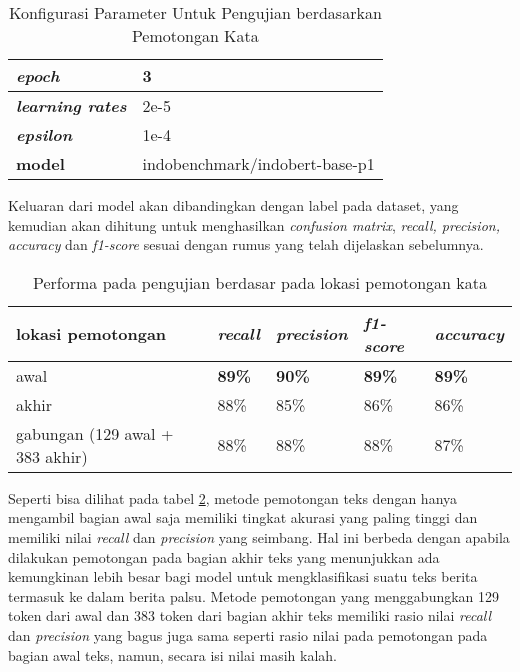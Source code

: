 \begin{table}
    \caption{Konfigurasi Parameter Untuk Pengujian berdasarkan Pemotongan Kata}
    \label{tab: truncate_param}
    \centering
    \begin{tabular}{|l|l|}
        \hline
        \textit{\textbf{epoch}}          & 3                              \\ \hline
        \textit{\textbf{learning rates}} & 2e-5                           \\ \hline
        \textit{\textbf{epsilon}}        & 1e-4                           \\ \hline
        \textbf{model}                   & indobenchmark/indobert-base-p1 \\ \hline
    \end{tabular}
\end{table}

Keluaran dari model akan dibandingkan dengan label pada dataset, yang kemudian akan dihitung untuk menghasilkan \textit{confusion matrix}, \textit{recall, precision, accuracy} dan \textit{f1-score} sesuai dengan rumus yang telah dijelaskan sebelumnya.

\begin{table}
    \centering
    \caption{Performa pada pengujian berdasar pada lokasi pemotongan kata}
    \label{tab: truncate_result}
    \begin{tabular}{|p{}|l|l|l|l|}
        \hline
        \textbf{lokasi pemotongan}      & \textit{\textbf{recall}} & \textit{\textbf{precision}} & \textit{\textbf{f1-score}} & \textit{\textbf{accuracy}} \\ \hline
        awal                            & \textbf{89\%}            & \textbf{90\%}               & \textbf{89\%}              & \textbf{89\%}              \\ \hline
        akhir                           & 88\%                     & 85\%                        & 86\%                       & 86\%                       \\ \hline
        gabungan (129 awal + 383 akhir) & 88\%                     & 88\%                        & 88\%                       & 87\%                       \\ \hline
    \end{tabular}
\end{table}

Seperti bisa dilihat pada tabel \ref{tab: truncate_result}, metode pemotongan teks dengan hanya mengambil bagian awal saja memiliki tingkat akurasi yang paling tinggi dan memiliki nilai \textit{recall} dan \textit{precision} yang seimbang. Hal ini berbeda dengan apabila dilakukan pemotongan pada bagian akhir teks yang menunjukkan ada kemungkinan lebih besar bagi model untuk mengklasifikasi suatu teks berita termasuk ke dalam berita palsu. Metode pemotongan yang menggabungkan 129 token dari awal dan 383 token dari bagian akhir teks memiliki rasio nilai \textit{recall} dan \textit{precision} yang bagus juga sama seperti rasio nilai pada pemotongan pada bagian awal teks, namun, secara isi nilai masih kalah.

